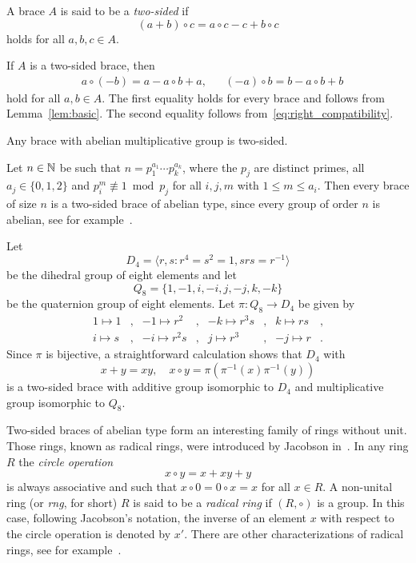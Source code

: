 \begin{definition}
	A brace $A$ is said to be a \emph{two-sided} if 
	\begin{equation}
	\label{eq:right_compatibility}
	(a+b)\circ c=a\circ c-c+b\circ c
	\end{equation}
	holds for all $a,b,c\in A$. 
\end{definition}

If $A$ is a two-sided brace, then 
\begin{align}
\label{eq:2sided}
&a\circ(-b)=a-a\circ b+a,
&&(-a)\circ b=b-a\circ b+b    
\end{align}
hold for all $a,b\in A$. The first equality holds for every brace and follows from Lemma~\ref{lem:basic}. 
The second equality follows from~\eqref{eq:right_compatibility}. 

\begin{example}
  Any brace with abelian multiplicative group is 
  two-sided.
\end{example}

\begin{example}
  Let $n\in\mathbb{N}$ be such that $n=p_1^{a_1}\cdots p_k^{a_k}$, where the $p_j$ are
  distinct primes, all $a_j\in\{0,1,2\}$ and $p_i^m\not\equiv 1\bmod{p_j}$ for
  all $i,j,m$ with $1\leq m\leq a_i$. Then every brace of size $n$ is a
  two-sided brace of abelian type, since every group of order $n$ is abelian, see for
  example~\cite{MR1786236}.  
\end{example}

\begin{example}
	\label{exa:d8q8}
	Let 
	\[
	D_4=\langle r,s:r^4=s^2=1,srs=r^{-1}\rangle
	\]
	be the dihedral group of eight elements and let
	\[
	Q_8=\{1,-1,i,-i,j,-j,k,-k\}
	\]
	be the quaternion group of eight elements.  Let
	$\pi:Q_8\to D_4$ be given by 
	\begin{align*}
		1\mapsto 1 &, & -1\mapsto r^2 &,  & -k\mapsto r^3s &,&  k\mapsto rs &,\\
		i\mapsto s &, & -i\mapsto r^2s &, &  j\mapsto r^3 &, & -j\mapsto r &.
	\end{align*}
	Since $\pi$ is bijective, 
	a straightforward calculation shows that $D_4$ with 
	\[
	  x+y=xy,\quad 
	  x\circ y=\pi(\pi^{-1}(x)\pi^{-1}(y))
	\]
	is a two-sided brace with additive group isomorphic to $D_4$ and multiplicative group
	isomorphic to $Q_8$. 
\end{example}

Two-sided braces of abelian type form an interesting family of rings without unit. Those rings, known as radical rings, 
were introduced by Jacobson in~\cite{MR12271}. In any ring $R$ the \emph{circle operation} 
\[
x\circ y=x+xy+y
\]
is always associative 
and such that $x\circ 0=0\circ x=x$ for all $x\in R$. A non-unital ring (or \emph{rng}, for short) 
$R$ is said to be a \emph{radical ring} if $(R,\circ)$ is a group. 
In this case, following Jacobson's notation, the inverse of an element $x$ with respect to the circle operation is denoted by $x'$. 
There are other characterizations of radical rings, see for example~\cite{MR3308118}.

